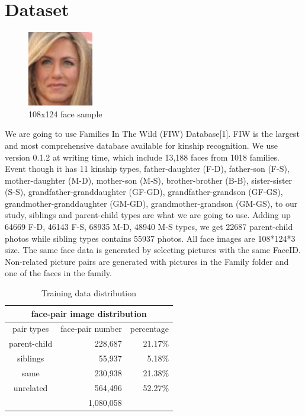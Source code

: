 \documentclass{article}
\begin{document}
\section{Dataset}

\begin{figure}
\caption{108x124 face sample}
\includegraphics{img/P00241_face0}
\end{figure}

We are going to use Families In The Wild (FIW) Database[1]. FIW is the largest
and most comprehensive database available for kinship recognition. We use
version 0.1.2 at writing time, which include 13,188 faces from 1018 families.
Event though it has 11 kinship types, father-daughter (F-D), father-son (F-S),
mother-daughter (M-D), mother-son (M-S), brother-brother (B-B), sister-sister
(S-S), grandfather-granddaughter (GF-GD), grandfather-grandson (GF-GS),
grandmother-granddaughter (GM-GD), grandmother-grandson (GM-GS), to our study,
siblings and parent-child types are what we are going to use. Adding up 64669
F-D, 46143 F-S, 68935 M-D, 48940 M-S types, we get 22687 parent-child photos
while sibling types contains 55937 photos. All face images are 108*124*3 size.
The same face data is generated by selecting pictures with the same FaceID.
Non-related picture pairs are generated with pictures in the Family folder and
one of the faces in the family.

\begin{table}[h]
	\centering
	\begin{tabular}{ | c || r r | }
		\hline
		\multicolumn{3}{|c|}{face-pair image distribution} \\
		\hline
		pair types&face-pair number&percentage\\
		\hline
			parent-child & 228,687 &21.17\% \\
			siblings & 55,937 & 5.18\% \\
			same & 230,938 & 21.38\% \\
			unrelated & 564,496 & 52.27\% \\
		\hline
			& 1,080,058 & \\
		\hline
	\end{tabular}
	\caption{Training data distribution}
	\label{table:1}
\end{table}
\end{document}
